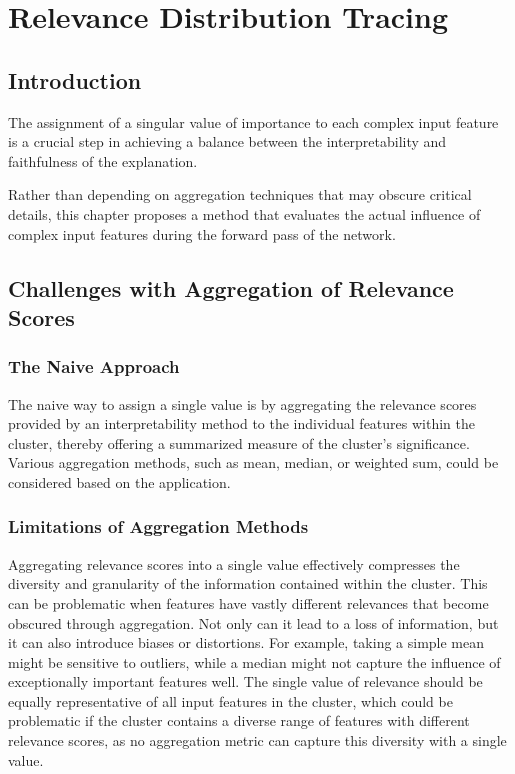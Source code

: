 \chapter{Relevance Distribution Tracing}
\label{chapter:assigning}

\section{Introduction}

The assignment of a singular value of importance to each complex input feature is a crucial
step in achieving a balance between the interpretability and faithfulness of the explanation.

Rather than depending on aggregation techniques that may obscure critical details, this chapter proposes a method that evaluates the actual influence of complex input features during the forward pass of the network. 

\section{Challenges with Aggregation of Relevance Scores}

\subsection{The Naive Approach}

The naive way to assign a single value is by aggregating the relevance scores provided by an interpretability method to the individual features within the cluster, thereby offering a summarized measure of the cluster's significance. Various aggregation methods, such as mean, median, or weighted sum, could be considered based on the application.

\subsection{Limitations of Aggregation Methods}

Aggregating relevance scores into a single value effectively compresses the diversity and granularity of the information contained within the cluster. This can be problematic when features have vastly different relevances that become obscured through aggregation. Not only can it lead to a loss of information, but it can also introduce biases or distortions. For example, taking a simple mean might be sensitive to outliers, while a median might not capture the influence of exceptionally important features well. The single value of relevance should be equally representative of all input features in the cluster, which could be problematic if the cluster contains a diverse range of features with different relevance scores, as no aggregation metric can capture this diversity with a single value.

